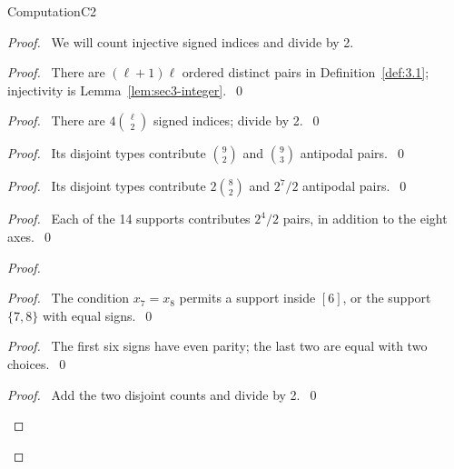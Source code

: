 \begin{namedresult}{Computation}{C2}\label{comp:C2}
\end{namedresult}
\begin{proof}
 \pfsketch\ We will count injective signed indices and divide by 2.
 \begin{proof}\pf\ There are $(\ell+1)\ell$ ordered distinct pairs in
  Definition~\ref{def:3.1}; injectivity is Lemma~\ref{lem:sec3-integer}.~\qed\end{proof}
 \begin{proof}\pf\ There are $4\binom\ell2$ signed indices; divide by 2.~\qed\end{proof}
 \begin{proof}\pf\ Its disjoint types contribute $\binom92$ and $\binom93$ antipodal pairs.~\qed\end{proof}
 \begin{proof}\pf\ Its disjoint types contribute $2\binom82$ and $2^7/2$ antipodal pairs.~\qed\end{proof}
 \begin{proof}\pf\ Each of the 14 supports contributes $2^4/2$ pairs, in addition to the eight axes.~\qed\end{proof}
 \begin{proof}
  \begin{proof}\pf\ The condition $x_7=x_8$ permits a support inside $[6]$, or the
   support $\{7,8\}$ with equal signs.~\qed\end{proof}
  \begin{proof}\pf\ The first six signs have even parity; the last two are equal with two choices.~\qed\end{proof}
  \qedstep
  \begin{proof}\pf\ Add the two disjoint counts and divide by 2.~\qed\end{proof}

\end{proof}
\end{proof}
